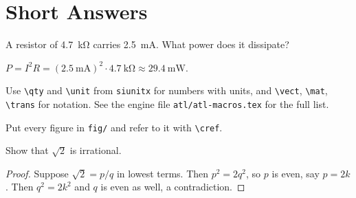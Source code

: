 \section{Short Answers}

\begin{problem}[Units][5]
A resistor of \qty{4.7}{\kilo\ohm} carries \qty{2.5}{\milli\ampere}. What power does it dissipate?
\end{problem}

\begin{solution}
$P = I^2R = (\qty{2.5}{\milli\ampere})^2\cdot\qty{4.7}{\kilo\ohm} \approx \qty{29.4}{\milli\watt}$.
\end{solution}

\begin{notebox}
Use \texttt{\textbackslash qty} and \texttt{\textbackslash unit} from \texttt{siunitx} for numbers with units, and
\texttt{\textbackslash vect}, \texttt{\textbackslash mat}, \texttt{\textbackslash trans} for notation. See the
engine file \texttt{atl/atl-macros.tex} for the full list.
\end{notebox}

\begin{tipbox}[Tip]
Put every figure in \texttt{fig/} and refer to it with \texttt{\textbackslash cref}.
\end{tipbox}

\begin{problem}[Proof][10]
Show that $\sqrt{2}$ is irrational.
\end{problem}

\begin{proof}
Suppose $\sqrt2=p/q$ in lowest terms. Then $p^2=2q^2$, so $p$ is even, say $p=2k$. Then $q^2=2k^2$ and $q$ is even as well, a contradiction.
\end{proof}
